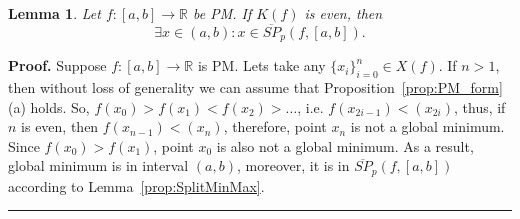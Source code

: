 \documentclass[12pt, a4paper]{article}
\newtheorem{lemma}[theorem]{Lemma}
\newenvironment{proof}[1][Proof]{\noindent \textbf{#1.} }{\  \rule{0.5em}{0.5em}}
\numberwithin{equation}{section}
\begin{document}
\begin{lemma}\label{lm:evenkappa}
  Let $f:[a,b] \rightarrow \mathbb{R}$ be PM.
  If $K(f)$ is even, then
  \begin{equation}
    \exists x \in (a, b): x \in  \overline{SP}_p(f, [a, b]). 
  \end{equation}       
\end{lemma}
\begin{proof}
  Suppose $f:[a, b] \rightarrow \mathbb{R}$ is PM.
  Lets take any $\{x_i\}_{i=0}^n \in X(f)$.
  If $n>1$, then without loss of generality
  we can assume that Proposition~\ref{prop:PM_form}(a) 
  holds. So, $f(x_0)>f(x_1)<f(x_2)>\dots$, i.e.
  $f(x_{2i-1})<(x_{2i})$, thus,
  if $n$ is even, then $f(x_{n-1})<(x_{n})$,
  therefore, point $x_{n}$ is not a global minimum.
  Since $f(x_0)>f(x_1)$, point $x_0$ is also
  not a global minimum. As a result,
  global minimum is in interval $(a, b)$,
  moreover, it is in $\overline{SP}_p(f, [a, b])$ according to
  Lemma~\ref{prop:SplitMinMax}. 
\end{proof}
\end{document}
